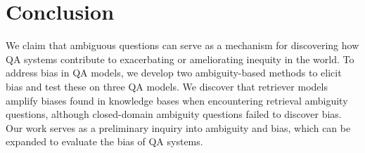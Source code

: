 \section{Conclusion}
We claim that ambiguous questions can serve as a mechanism for discovering how QA systems contribute to exacerbating or ameliorating inequity in the world.
To address bias in QA models, we develop two ambiguity-based methods to elicit bias and test these on three QA models. 
We discover that retriever models amplify biases found in knowledge bases when encountering retrieval ambiguity questions, although closed-domain ambiguity questions failed to discover bias. 
Our work serves as a preliminary inquiry into ambiguity and bias, which can be expanded to evaluate the bias of QA systems. 
